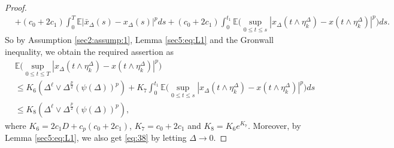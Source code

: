 \documentclass[11pt]{article}
\begin{document}
\begin{proof}
\begin{align*}
&+(c_0+2c_1)\int_{0}^{T}\mathbb{E}|\bar{x}_{\Delta}(s)-x_{\Delta}(s)|^pds+(c_0+2c_1)\int_{0}^{t_1}\mathbb{E}\Big(\sup_{0\le t\le s}|x_{\Delta}(t\wedge \eta^{\Delta}_k)-x(t\wedge \eta^{\Delta}_k)|^p\Big)ds.
\end{align*}
So by  Assumption \ref{sec2:assump:1}, Lemma \ref{sec5:eq:L1} and the Gronwall inequality, we obtain the required assertion as
\begin{align*}
&\mathbb{E}\Big( \sup_{0\leq t \leq T}|x_{\Delta}(t\wedge\eta^{\Delta}_k)-x(t \wedge \eta^{\Delta}_k)|^p  \Big)\\
&\le K_6(\Delta^{\ell}\vee\Delta^{\frac{p}{2}}(\psi(\Delta))^p)+K_7\int_{0}^{t_1}\mathbb{E}\Big(\sup_{0\le t\le s}|x_{\Delta}(t\wedge \eta^{\Delta}_k)-x(t\wedge \eta^{\Delta}_k)|^p\Big)ds\\
&\le  K_8(\Delta^{\ell}\vee\Delta^{\frac{p}{2}}(\psi(\Delta))^p),
\end{align*}
where $K_6=2c_1D+c_p(c_0+2c_1)$, $K_7=c_0+2c_1$ and $K_8=K_6e^{K_7}$. Moreover,  by Lemma \ref{sec5:eq:L1}, we also get \eqref{eq:38} by letting $\Delta\rightarrow 0$.
\end{proof}
\end{document}

